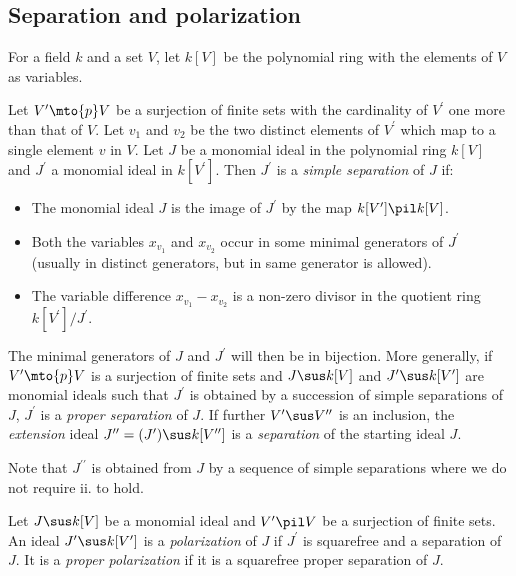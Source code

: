 \setcounter{section}{1}\setcounter{cdrthm}{0}
\subsection{Separation and polarization}

For a field $k$ and a set $V$, let $k[V]$ be the polynomial ring with the
elements of $V$ as variables.
\begin{defi} \label{def:intro-sep}
Let $V^\prime \mto{p} V$ be a surjection of finite sets with the
cardinality of $V^\prime$ one more than that of $V$. Let $v_1$ and $v_2$
be the two distinct elements of $V^\prime$ which map to a single
element $v$ in $V$. Let $J$ be a monomial ideal in the polynomial ring
$k[V]$ and $J^\prime$ a monomial ideal in $k[V^\prime]$.
Then $J^\prime$ is a {\it simple separation} of $J$ if:
\begin{itemize}
\item[i.] The monomial ideal $J$ is the image of $J^\prime$ by the map
$k[V^\prime] \pil k[V]$.
\item[ii.] Both the variables $x_{v_1}$ and $x_{v_2}$ occur in some minimal
  generators of $J^\prime$ (usually in distinct generators, but in same
  generator is allowed).
\item[iii.] The variable difference $x_{v_1} - x_{v_2}$ is a non-zero divisor
in the quotient ring $k[V^\prime]/J^\prime$.
\end{itemize}

The minimal generators of $J$ and $J^\prime$ will then be
in bijection.
More generally, if $V^\prime \mto{p} V$ is a surjection of finite sets
and $J \sus k[V]$ and $J^\prime \sus k[V^\prime]$ are monomial ideals such
that $J^\prime$ is obtained by a succession of simple separations of $J$,
$J^\prime$ is a {\it proper separation} of $J$.
 If further $V^\prime \sus V^{\prime \prime}$ is an inclusion,
  the {\it extension} ideal $J^{\prime \prime} = (J^\prime) \sus k[V^{\prime \prime}]$
 is a {\it separation} of the starting ideal $J$.

\end{defi}

Note that $J^{\prime \prime}$ is obtained from $J$ by a sequence of
simple separations where we do not require ii. to hold. 

\begin{defi} \label{def:intro-pol}
  Let $J \sus k[V]$ be a monomial ideal and $V^\prime \pil V$ be a surjection
  of finite sets. An ideal $J^\prime \sus k[V^\prime]$ is a
  {\it polarization}
  of $J$ if $J^\prime$ is squarefree and a separation of $J$.
  It is a {\it proper polarization} if it is a squarefree proper
  separation of $J$. 
\end{defi}


